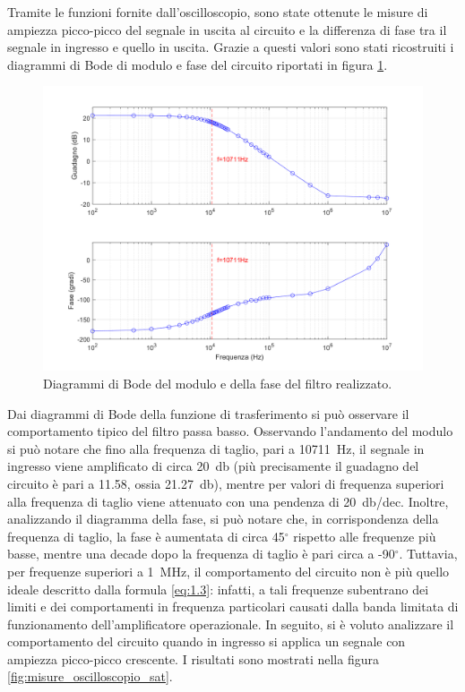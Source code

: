 \noindent
Tramite le funzioni fornite dall'oscilloscopio, sono state ottenute le misure di ampiezza picco-picco del segnale in uscita al circuito e la differenza di fase tra il segnale in ingresso e quello in uscita. Grazie a questi valori sono stati ricostruiti i diagrammi di Bode di modulo e fase del circuito riportati in figura \ref{fig:diagrammi_di_Bode}.
\begin{figure}[h!]
	\centering
	\includegraphics[width=0.80\linewidth]{./ImageFiles/Laboratorio 1/Diagrammi di Bode.png}
	\caption{Diagrammi di Bode del modulo e della fase del filtro realizzato.}
	\label{fig:diagrammi_di_Bode}
\end{figure}
Dai diagrammi di Bode della funzione di trasferimento si può osservare il comportamento tipico del filtro passa basso. Osservando l'andamento del modulo si può notare che fino alla frequenza di taglio, pari a \SI{10711}{\hertz}, il segnale in ingresso viene amplificato di circa \SI{20}{\decibel} (più precisamente il guadagno del circuito è pari a 11.58, ossia \SI{21.27}{\decibel}), mentre per valori di frequenza superiori alla frequenza di taglio viene attenuato con una pendenza di \SI{20}{\decibel}/dec. Inoltre, analizzando il diagramma della fase, si può notare che, in corrispondenza della frequenza di taglio, la fase è aumentata di circa 45$^{\circ}$ rispetto alle frequenze più basse, mentre una decade dopo la frequenza di taglio è pari circa a -90$^{\circ}$.
Tuttavia, per frequenze superiori a \SI{1}{\mega\hertz}, il comportamento del circuito non è più quello ideale descritto dalla formula \ref{eq:1.3}: infatti, a tali frequenze subentrano dei limiti e dei comportamenti in frequenza particolari causati dalla banda limitata di funzionamento dell'amplificatore operazionale.
\clearpage
In seguito, si è voluto analizzare il comportamento del circuito quando in ingresso si applica un segnale con ampiezza picco-picco crescente. I risultati sono mostrati nella figura \ref{fig:misure_oscilloscopio_sat}.
